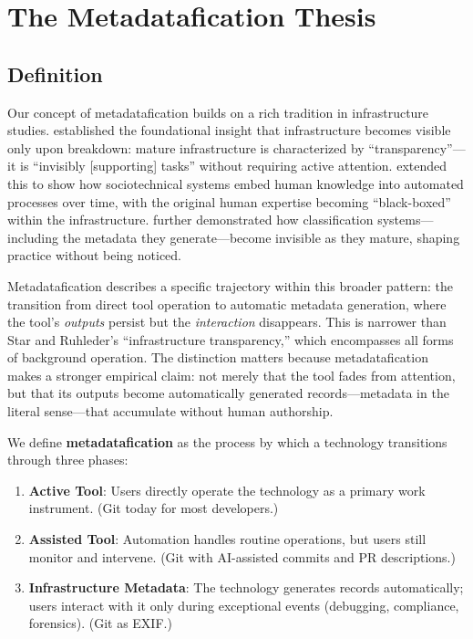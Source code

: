 \documentclass[sigconf, nonacm, anonymous=false]{acmart}
\begin{document}
\section{The Metadatafication Thesis}

\subsection{Definition}

Our concept of metadatafication builds on a rich tradition in infrastructure studies. \citet{star1996steps} established the foundational insight that infrastructure becomes visible only upon breakdown: mature infrastructure is characterized by ``transparency''---it is ``invisibly [supporting] tasks'' without requiring active attention. \citet{edwards2003infrastructure} extended this to show how sociotechnical systems embed human knowledge into automated processes over time, with the original human expertise becoming ``black-boxed'' within the infrastructure. \citet{bowker1999sorting} further demonstrated how classification systems---including the metadata they generate---become invisible as they mature, shaping practice without being noticed.

Metadatafication describes a specific trajectory within this broader pattern: the transition from direct tool operation to automatic metadata generation, where the tool's \textit{outputs} persist but the \textit{interaction} disappears. This is narrower than Star and Ruhleder's ``infrastructure transparency,'' which encompasses all forms of background operation. The distinction matters because metadatafication makes a stronger empirical claim: not merely that the tool fades from attention, but that its outputs become automatically generated records---metadata in the literal sense---that accumulate without human authorship.

We define \textbf{metadatafication} as the process by which a technology transitions through three phases:

\begin{enumerate}
  \item \textbf{Active Tool}: Users directly operate the technology as a primary work instrument. (Git today for most developers.)
  \item \textbf{Assisted Tool}: Automation handles routine operations, but users still monitor and intervene. (Git with AI-assisted commits and PR descriptions.)
  \item \textbf{Infrastructure Metadata}: The technology generates records automatically; users interact with it only during exceptional events (debugging, compliance, forensics). (Git as EXIF.)
\end{enumerate}
\end{document}
